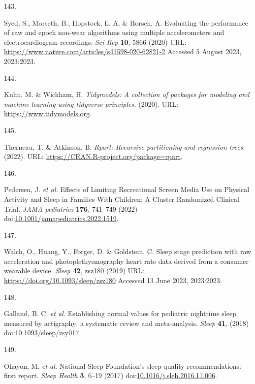 \documentclass[
  10pt,
]{scrbook}
\newlength{\cslhangindent}
\newlength{\csllabelwidth}
\newlength{\cslentryspacingunit} %
\newenvironment{CSLReferences}[2] %
 {%
  \setlength{\parindent}{0pt}
  \ifodd #1
  \let\oldpar\par
  \def\par{\hangindent=\cslhangindent\oldpar}
  \fi
  \setlength{\parskip}{#2\cslentryspacingunit}
 }%
 {}
\newcommand{\CSLLeftMargin}[1]{\parbox[t]{\csllabelwidth}{#1}}
\newcommand{\CSLRightInline}[1]{\parbox[t]{\linewidth - \csllabelwidth}{#1}\break}
\let\originaltextbf\textbf
\renewcommand{\textbf}[1]{\textcolor{color1}{\originaltextbf{#1}}}
\begin{document}
\begin{CSLReferences}{0}{0}
\leavevmode{}%
\CSLLeftMargin{143. }%
\CSLRightInline{Syed, S., Morseth, B., Hopstock, L. A. \& Horsch, A.
Evaluating the performance of raw and epoch non-wear algorithms using
multiple accelerometers and electrocardiogram recordings. \emph{Sci Rep}
\textbf{10}, 5866 (2020) URL:
\url{https://www.nature.com/articles/s41598-020-62821-2} Accessed 5
August 2023, 2023:2023.}

\leavevmode{}%
\CSLLeftMargin{144. }%
\CSLRightInline{Kuhn, M. \& Wickham, H. \emph{Tidymodels: A collection
of packages for modeling and machine learning using tidyverse
principles.} (2020). URL: \url{https://www.tidymodels.org}.}

\leavevmode{}%
\CSLLeftMargin{145. }%
\CSLRightInline{Therneau, T. \& Atkinson, B. \emph{Rpart: Recursive
partitioning and regression trees}. (2022). URL:
\url{https://CRAN.R-project.org/package=rpart}.}

\leavevmode{}%
\CSLLeftMargin{146. }%
\CSLRightInline{Pedersen, J. \emph{et al.} Effects of Limiting
Recreational Screen Media Use on Physical Activity and Sleep in Families
With Children: A Cluster Randomized Clinical Trial. \emph{JAMA
pediatrics} \textbf{176}, 741--749 (2022)
doi:\href{https://doi.org/10.1001/jamapediatrics.2022.1519}{10.1001/jamapediatrics.2022.1519}.}

\leavevmode{}%
\CSLLeftMargin{147. }%
\CSLRightInline{Walch, O., Huang, Y., Forger, D. \& Goldstein, C. Sleep
stage prediction with raw acceleration and photoplethysmography heart
rate data derived from a consumer wearable device. \emph{Sleep}
\textbf{42}, zsz180 (2019) URL:
\url{https://doi.org/10.1093/sleep/zsz180} Accessed 13 June 2023,
2023:2023.}

\leavevmode{}%
\CSLLeftMargin{148. }%
\CSLRightInline{Galland, B. C. \emph{et al.} Establishing normal values
for pediatric nighttime sleep measured by actigraphy: a systematic
review and meta-analysis. \emph{Sleep} \textbf{41}, (2018)
doi:\href{https://doi.org/10.1093/sleep/zsy017}{10.1093/sleep/zsy017}.}

\leavevmode{}%
\CSLLeftMargin{149. }%
\CSLRightInline{Ohayon, M. \emph{et al.} National Sleep Foundation's
sleep quality recommendations: first report. \emph{Sleep Health}
\textbf{3}, 6--19 (2017)
doi:\href{https://doi.org/10.1016/j.sleh.2016.11.006}{10.1016/j.sleh.2016.11.006}.}


\end{CSLReferences}
\end{document}
